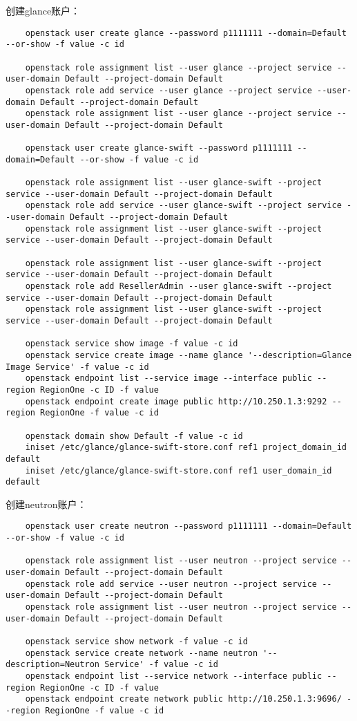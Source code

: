 \documentclass[a4paper,left=1.5cm,right=1.5cm,11pt]{article}
\begin{document}
	创建glance账户：
	\begin{lstlisting}
	openstack user create glance --password p1111111 --domain=Default --or-show -f value -c id
	
	openstack role assignment list --user glance --project service --user-domain Default --project-domain Default
	openstack role add service --user glance --project service --user-domain Default --project-domain Default
	openstack role assignment list --user glance --project service --user-domain Default --project-domain Default
	
	openstack user create glance-swift --password p1111111 --domain=Default --or-show -f value -c id
	
	openstack role assignment list --user glance-swift --project service --user-domain Default --project-domain Default
	openstack role add service --user glance-swift --project service --user-domain Default --project-domain Default
	openstack role assignment list --user glance-swift --project service --user-domain Default --project-domain Default

	openstack role assignment list --user glance-swift --project service --user-domain Default --project-domain Default
	openstack role add ResellerAdmin --user glance-swift --project service --user-domain Default --project-domain Default
	openstack role assignment list --user glance-swift --project service --user-domain Default --project-domain Default
	
	openstack service show image -f value -c id
	openstack service create image --name glance '--description=Glance Image Service' -f value -c id
	openstack endpoint list --service image --interface public --region RegionOne -c ID -f value
	openstack endpoint create image public http://10.250.1.3:9292 --region RegionOne -f value -c id

	openstack domain show Default -f value -c id
	iniset /etc/glance/glance-swift-store.conf ref1 project_domain_id default
	iniset /etc/glance/glance-swift-store.conf ref1 user_domain_id default
	\end{lstlisting}

	创建neutron账户：
	\begin{lstlisting}
	openstack user create neutron --password p1111111 --domain=Default --or-show -f value -c id

	openstack role assignment list --user neutron --project service --user-domain Default --project-domain Default
	openstack role add service --user neutron --project service --user-domain Default --project-domain Default
	openstack role assignment list --user neutron --project service --user-domain Default --project-domain Default

	openstack service show network -f value -c id
	openstack service create network --name neutron '--description=Neutron Service' -f value -c id
	openstack endpoint list --service network --interface public --region RegionOne -c ID -f value
	openstack endpoint create network public http://10.250.1.3:9696/ --region RegionOne -f value -c id
	\end{lstlisting}
\end{document}
